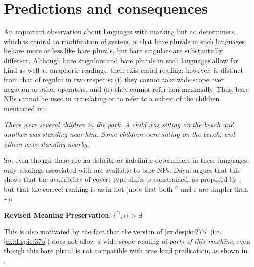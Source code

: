 \documentclass[output=paper,
modfonts
]{langscibook}
\begin{document}
	\section{Predictions and consequences}  \label{sec:despic:4} 
	
	An important observation about languages with  marking but no determiners, which is
	central to  modification of  system, is that bare plurals in such languages behave more or less like  bare plurals, but bare singulars are substantially different. Although bare singulars and bare plurals in such languages allow for kind as well as anaphoric readings, their existential reading, however, is distinct from that of regular 
	in two respects: (i) they cannot take wide scope over negation or other operators, and (ii) they cannot refer non-maximally. Thus, bare NPs cannot be used in translating  or  to refer
	to a subset of the children mentioned in  \citep[1100]{Dayal2011}:
	
	\ea \label{ex:despic:35}
	\ea \label{ex:despic:35a}
	\textit{There were several children in the park.}
	\ex \label{ex:despic:35b}
	\textit{A child was sitting on the bench and another was standing near him.}
	\ex \label{ex:despic:35c}
	\textit{Some children were sitting on the bench, and others were standing nearby.} 
	\z 
	\z 
	
	So, even though there are no definite or indefinite determiners in these languages, only readings associated with  are available to bare NPs. Dayal argues that this shows that the availability of covert type shifts is constrained, as proposed by \citet{Chierchia1998}, but that the correct ranking is as in  not  (note that both $^\cap$ and $\iota$ are simpler than $\exists$):
	
	\ea \label{ex:despic:36}
	\textbf{Revised Meaning Preservation}: $\{^\cap,\iota\}>\exists$ \citep[219]{Dayal2004} 
	\z 
	
	This is also motivated by the fact that the  version of \ref{ex:despic:27b} (i.e. \ref{ex:despic:37b}) does not allow a
	wide scope reading of \textit{parts of this machine}, even though this bare plural is not compatible with true kind predication, as shown in .
	
\end{document}
